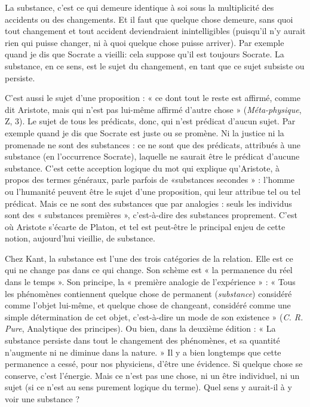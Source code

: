 La substance, c’est ce qui demeure identique à soi sous la multiplicité des
accidents ou des changements. Et il faut que quelque chose demeure, sans quoi
tout changement et tout accident deviendraient inintelligibles (puisqu'il n’y
aurait rien qui puisse changer, ni à quoi quelque chose puisse arriver). Par
exemple quand je dis que Socrate a vieilli: cela suppose qu’il est toujours
Socrate. La substance, en ce sens, est le sujet du changement, en tant que ce
sujet subsiste ou persiste.

C’est aussi le sujet d’une proposition : « ce dont tout le reste est affirmé,
comme dit Aristote, mais qui n’est pas lui-même affirmé d’autre chose » ({\it Méta-physique},
Z, 3). Le sujet de tous les prédicats, donc, qui n’est prédicat d’aucun
sujet. Par exemple quand je dis que Socrate est juste ou se promène. Ni la justice
ni la promenade ne sont des substances : ce ne sont que des prédicats, attribués
à une substance (en l’occurrence Socrate), laquelle ne saurait être le prédicat
d'aucune substance. C’est cette acception logique du mot qui explique
qu’Aristote, à propos des termes généraux, parle parfois de «substances
secondes » : l’homme ou l’humanité peuvent être le sujet d’une proposition,
qui leur attribue tel ou tel prédicat. Mais ce ne sont des substances que par
analogies : seuls les individus sont des « substances premières », c’est-à-dire des
substances proprement. C’est où Aristote s’écarte de Platon, et tel est peut-être
le principal enjeu de cette notion, aujourd’hui vieillie, de substance.

Chez Kant, la substance est l’une des trois catégories de la relation. Elle est
ce qui ne change pas dans ce qui change. Son schème est « la permanence du
réel dans le temps ». Son principe, la « première analogie de l'expérience » :
« Tous les phénomènes contiennent quelque chose de permanent ({\it substance})
considéré comme l’objet lui-même, et quelque chose de changeant, considéré
comme une simple détermination de cet objet, c’est-à-dire un mode de son
existence » ({\it C. R. Pure}, Analytique des principes). Ou bien, dans la deuxième
édition : « La substance persiste dans tout le changement des phénomènes, et sa
quantité n’augmente ni ne diminue dans la nature. » Il y a bien longtemps que
cette permanence a cessé, pour nos physiciens, d’être une évidence. Si quelque
chose se conserve, c’est l’énergie. Mais ce n’est pas une chose, ni un être individuel,
ni un sujet (si ce n’est au sens purement logique du terme). Quel sens y
aurait-il à y voir une substance ?

